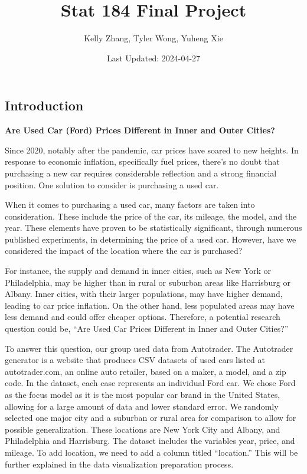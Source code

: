 \documentclass[
]{article}
\title{Stat 184 Final Project}
\author{Kelly Zhang, Tyler Wong, Yuheng Xie}
\date{Last Updated: 2024-04-27}
\begin{document}
\maketitle

\hypertarget{introduction}{%
\subsection{Introduction}\label{introduction}}

\textbf{Are Used Car (Ford) Prices Different in Inner and Outer Cities?}

Since 2020, notably after the pandemic, car prices have soared to new
heights. In response to economic inflation, specifically fuel prices,
there's no doubt that purchasing a new car requires considerable
reflection and a strong financial position. One solution to consider is
purchasing a used car.

When it comes to purchasing a used car, many factors are taken into
consideration. These include the price of the car, its mileage, the
model, and the year. These elements have proven to be statistically
significant, through numerous published experiments, in determining the
price of a used car. However, have we considered the impact of the
location where the car is purchased?

For instance, the supply and demand in inner cities, such as New York or
Philadelphia, may be higher than in rural or suburban areas like
Harrisburg or Albany. Inner cities, with their larger populations, may
have higher demand, leading to car price inflation. On the other hand,
less populated areas may have less demand and could offer cheaper
options. Therefore, a potential research question could be, ``Are Used
Car Prices Different in Inner and Outer Cities?''

To answer this question, our group used data from Autotrader. The
Autotrader generator is a website that produces CSV datasets of used
cars listed at autotrader.com, an online auto retailer, based on a
maker, a model, and a zip code. In the dataset, each case represents an
individual Ford car. We chose Ford as the focus model as it is the most
popular car brand in the United States, allowing for a large amount of
data and lower standard error. We randomly selected one major city and a
suburban or rural area for comparison to allow for possible
generalization. These locations are New York City and Albany, and
Philadelphia and Harrisburg. The dataset includes the variables year,
price, and mileage. To add location, we need to add a column titled
``location.'' This will be further explained in the data visualization
preparation process.
\end{document}

